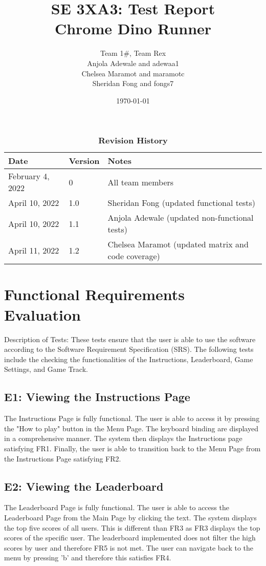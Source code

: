 \documentclass[12pt, titlepage]{article}
\title{SE 3XA3: Test Report\\Chrome Dino Runner}
\author{Team 1\#, Team Rex
		\\ Anjola Adewale and adewaa1
		\\ Chelsea Maramot and maramotc
		\\ Sheridan Fong and fongs7
}
\date{\today}
\begin{document}
\maketitle

\tableofcontents
\listoftables
\listoffigures


\newpage

\newpage
\begin{table}[h]
\caption{\bf Revision History}
\begin{tabularx}{\textwidth}{p{3cm}p{2cm}X}
    \toprule {\bf Date} & {\bf Version} & {\bf Notes}\\
    \midrule
    February 4, 2022 & 0 & All team members\\
    \midrule
    April 10, 2022 & 1.0 & Sheridan Fong (updated functional tests)\\
    \midrule
    April 10, 2022 & 1.1 & Anjola Adewale (updated non-functional tests)\\
    \midrule
    April 11, 2022 & 1.2 & Chelsea Maramot (updated matrix and code coverage)\\
    \bottomrule
    
\end{tabularx}
\end{table}
\newpage

\section{Functional Requirements Evaluation}

Description of Tests: These tests ensure that the user is able to use the software according to the Software Requirement Specification (SRS). The following tests include the checking the functionalities of the Instructions, Leaderboard, Game Settings, and Game Track.

\subsection{E1: Viewing the Instructions Page}
The Instructions Page is fully functional. The user is able to access it by pressing the "How to play" button in the Menu Page. The keyboard binding are displayed in a comprehensive manner. The system then displays the Instructions page satisfying FR1. Finally, the user is able to transition back to the Menu Page from the Instructions Page satisfying FR2.

\subsection{E2: Viewing the Leaderboard}
The Leaderboard Page is fully functional. The user is able to access the Leaderboard Page from the Main Page by clicking the text. The system displays the top five scores of all users. This is different than FR3 as FR3 displays the top scores of the specific user. The leaderboard implemented does not filter the high scores by user and therefore FR5 is not met. The user can navigate back to the menu by pressing 'b' and therefore this satisfies FR4. 
\end{document}
